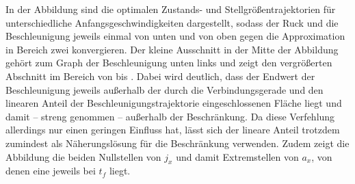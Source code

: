In der Abbildung sind die optimalen Zustands- und Stellgrößentrajektorien für unterschiedliche Anfangsgeschwindigkeiten dargestellt, sodass der Ruck und die Beschleunigung jeweils einmal von unten und von oben gegen die Approximation in Bereich zwei konvergieren. Der kleine Ausschnitt in der Mitte der Abbildung gehört zum Graph der Beschleunigung unten links und zeigt den vergrößerten Abschnitt im Bereich von  bis . Dabei wird deutlich, dass der Endwert der Beschleunigung jeweils außerhalb der durch die Verbindungsgerade und den linearen Anteil der Beschleunigungstrajektorie eingeschlossenen Fläche liegt und damit -- streng genommen -- außerhalb der Beschränkung. Da diese Verfehlung allerdings nur einen geringen Einfluss hat, lässt sich der lineare Anteil trotzdem zumindest als Näherungslösung für die Beschränkung verwenden. Zudem zeigt die Abbildung die beiden Nullstellen von $j_x$ und damit Extremstellen von $a_x$, von denen eine jeweils bei $t_f$ liegt.

